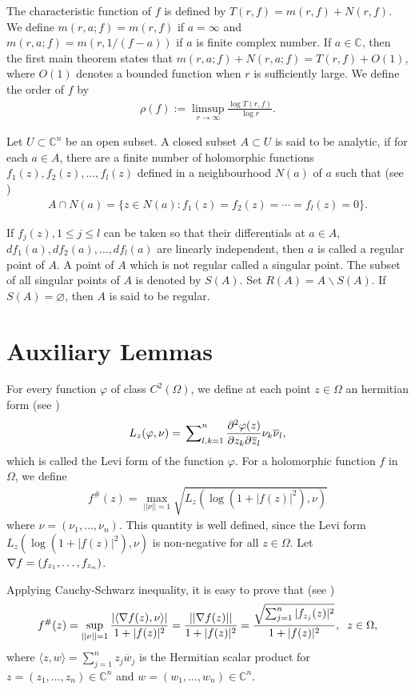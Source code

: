 \documentclass[11pt, reqno]{amsart}
\newtheorem*{cor A}{Corollary A}
\newtheorem*{cor B}{Corollary B}
\newcommand{\ol}{\overline}
\numberwithin{equation}{section}
\begin{document}
The characteristic function of $f$ is defined by $T(r, f)=m(r,f)+N(r,f)$.
We define $m(r,a;f)=m(r,f)$ if $a=\infty$ and $m(r,a;f)=m(r,1/(f-a))$ if $a$ is finite complex number. If $a\in\mathbb{C}$, then the first main theorem states that $m(r,a;f)+N(r,a;f)=T(r,f)+O(1)$, where $O(1)$ denotes a bounded function when $r$ is sufficiently large. We define the order of $f$ by
\begin{align*}
\rho(f):=\limsup _{r \rightarrow \infty} \frac{\log T(r, f)}{\log r}.
\end{align*}

Let $U\subset \mathbb{C}^n$ be an open subset. A closed subset $A\subset U$ is said to be analytic,
if for each $a\in A$, there are a finite number of holomorphic functions $f_1(z),f_2(z),\ldots,f_l(z)$ defined in a neighbourhood $N(a)$ of $a$ such that (see \cite[pp. 42]{NW})
\begin{align*}
A\cap N(a)=\{z\in N(a):f_1(z)=f_2(z)=\cdots=f_l(z)=0\}.
\end{align*}

If $f_j(z),1\leq j\leq l$ can be taken so that their differentials at $a\in A$, $df_1(a), df_2(a), \ldots,df_l(a)$ are linearly independent, then $a$ is called a regular point of $A$. A point of $A$ which is not regular called a singular point. The subset of all singular points of $A$ is denoted by $S(A)$. Set $R(A)=A\backslash  S(A)$. If $S(A)=\varnothing$, then $A$ is said to be regular. 


\section{\bf{Auxiliary Lemmas}}
For every function $\varphi$ of class $C^2(\Omega)$, we define at each point $z\in\Omega$ an hermitian form (see \cite{PVD1,PVD2})
\begin{align*}
L_z(\varphi,\nu)=\sideset{}{_{l,k=1}^n}{\sum} \frac{\partial^2 \varphi(z)}{\partial z_k \partial \ol{z}_l}\nu_k \ol{\nu}_l,
\end{align*}
which is called the Levi form of the function $\varphi$. For a holomorphic function $f$ in $\Omega$, we define
\begin{align*}
f^{\#}(z)=\max_{||\nu||=1}\sqrt{L_z(\log (1+|f(z)|^2),\nu)}
\end{align*}
where $\nu=(\nu_1,\ldots,\nu_n)$. This quantity is well defined, since the Levi form $L_z(\log (1+|f(z)|^2),\nu)$ is non-negative for all $z\in\Omega$. Let ${\bf \nabla} f=(f_{z_1},\ldots,f_{z_n})$.

Applying Cauchy-Schwarz inequality, it is easy to prove that (see \cite[Remark 1]{ZZY1})
\begin{align*}
f^{\#}(z)=\sup_{||\nu||=1}\frac{|\langle {\bf \nabla} f(z),\nu\rangle|}{1+|f(z)|^2}=\frac{||{\bf \nabla} f(z)||}{1+|f(z)|^2}=\frac{\sqrt{\sum_{j=1}^n|f_{z_j}(z)|^2}}{1+|f(z)|^2},\;\;z\in\Omega,
\end{align*}
where $\langle z, w\rangle=\sum_{j=1}^n z_j\ol{w}_j$ is the Hermitian scalar product for $z=(z_1,\ldots,z_n)\in\mathbb{C}^n$ and $w=(w_1,\ldots,w_n)\in\mathbb{C}^n$.
\medskip
\end{document}

